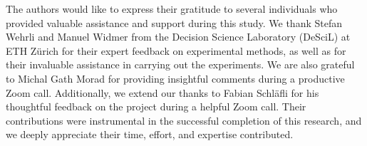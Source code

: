 The authors would like to express their gratitude to several individuals who provided valuable assistance and support during this study. We thank Stefan Wehrli and Manuel Widmer from the Decision Science Laboratory (DeSciL) at ETH Zürich for their expert feedback on experimental methods, as well as for their invaluable assistance in carrying out the experiments. We are also grateful to Michal Gath Morad for providing insightful comments during a productive Zoom call. Additionally, we extend our thanks to Fabian Schläfli for his thoughtful feedback on the project during a helpful Zoom call. Their contributions were instrumental in the successful completion of this research, and we deeply appreciate their time, effort, and expertise contributed. \\





% 

% 
